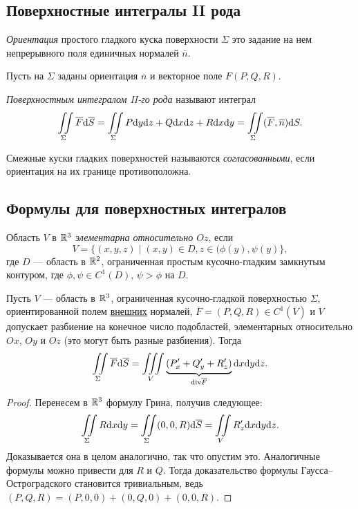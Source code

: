 \subsection{Поверхностные интегралы II рода}

\begin{Def}
\textit{Ориентация} простого гладкого куска поверхности $\Sigma$ это
задание на нем непрерывного поля единичных нормалей $\overline n$.
\end{Def}

Пусть на $\Sigma$ заданы ориентация $\overline n$ и векторное поле $F(P, Q, R)$. 

\begin{Def}
\textit{Поверхностным интегралом II-го рода} называют интеграл
$$
\iint\limits_{\Sigma} \overline F \mathrm{d} \overline S = \iint\limits_{\Sigma} P\mathrm{d} y \mathrm{d} z + Q \mathrm{d}x \mathrm{d} z+ R \mathrm{d}x \mathrm{d} y = \iint\limits_{\Sigma} (\overline F, \overline n) \mathrm{d} S.
$$
\end{Def}

\begin{Def}
Смежные куски гладких поверхностей называются \textit{согласованными}, если ориентация на их границе противоположна.
\end{Def}

\subsection{Формулы для поверхностных интегралов}

\begin{Def}
Область $V$ в $\mathbb{R}^3$ \textit{элементарна относительно $Oz$}, если 
$$V = \{ (x, y, z) \mid (x, y) \in D, z \in (\phi(y), \psi(y) \},$$
 где $D$ --- область в $\mathbb{R}^2$, ограниченная простым кусочно-гладким замкнутым контуром,  где $\phi, \psi \in C^{1}(D)$, $\psi > \phi$ на $D$.
\end{Def}

\begin{Theorem}
Пусть $V$ --- область в $\mathbb{R}^3$, ограниченная кусочно-гладкой поверхностью $\Sigma$, ориентированной полем \underline{внешних} нормалей, $\overline F = (P, Q, R) \in C^1(\overline V)$ и $V$ допускает разбиение на конечное число подобластей, элементарных относительно $Ox$, $Oy$ и $Oz$ (это могут быть разные разбиения). Тогда
$$
\iint\limits_{\Sigma}\overline F \mathrm{d} \overline S = \iiint\limits_V \underbrace{(P'_x + Q'_y + R'_z)}_{\mathrm{div} \overline F}\mathrm{d}x \mathrm{d} y \mathrm{d} z.
$$
\end{Theorem}
\begin{proof}
Перенесем в $\mathbb{R}^3$ формулу Грина, получив следующее:
$$
\iint\limits_{\Sigma} R\mathrm{d}x\mathrm{d} y = \iint\limits_{\Sigma} (0, 0, R)\mathrm{d} \overline S = \iint\limits_V R'_z \mathrm{d} x \mathrm{d} y \mathrm{d} z. 
$$
Доказывается она в целом аналогично, так что опустим это. Аналогичные формулы можно привести для $R$ и $Q$. Тогда доказательство формулы Гаусса--Остроградского становится тривиальным, ведь $(P, Q, R) = (P, 0, 0) + (0, Q, 0) + (0, 0, R)$.
\end{proof}

